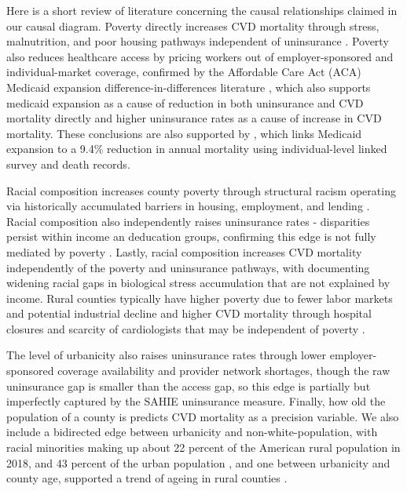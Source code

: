 \documentclass{article}
\theoremstyle{plain}
\theoremstyle{definition}
\theoremstyle{remark}
\begin{document}
\justifying
\noindent

Here is a short review of literature concerning
the causal relationships claimed in our causal diagram.
Poverty directly increases CVD mortality through stress,
malnutrition, and poor housing pathways independent of uninsurance \citep{kim2025mediating}. Poverty also reduces
healthcare access by pricing workers out of employer-sponsored and individual-market coverage, confirmed by the Affordable Care Act (ACA) Medicaid expansion difference-in-differences literature \citep{khatana2019association}, which also supports medicaid expansion as a cause of reduction in both uninsurance and CVD mortality directly and higher uninsurance rates as a cause of increase in CVD mortality. These conclusions are also supported by \citet{miller2021medicaid}, which links Medicaid expansion
to a 9.4\% reduction in annual mortality using individual-level linked survey and death records. 

Racial composition increases county poverty through structural racism operating via historically accumulated barriers in housing, employment, and lending \citep{bailey2021structural}. Racial composition also independently raises uninsurance rates - disparities persist within income an deducation groups, confirming this edge is not fully mediated by poverty \citep{lee2021convergence}. Lastly, racial composition increases CVD mortality independently of the poverty and uninsurance pathways, with \citet{geronimus2006weathering}
documenting widening racial gaps in biological stress accumulation that are not explained by income. Rural counties typically have higher poverty due to fewer labor markets and potential industrial decline \citep{farrigan2026rural} and higher CVD mortality through
hospital closures and scarcity of cardiologists that may be independent of poverty \citep{loccoh2022rural}.

The level of urbanicity also raises uninsurance rates through lower employer-sponsored coverage availability
and provider network shortages, though the raw uninsurance gap is smaller than the access gap, so this edge is partially but imperfectly captured by the SAHIE uninsurance measure. Finally, how old the population of a county is predicts CVD mortality as a precision variable. We also include a bidirected edge between urbanicity and non-white-population, with racial minorities making up about 22 percent of the American rural population in 2018, and 43 percent of the urban population \citep{castillo2020racial},
and one between urbanicity and county age, supported a trend of ageing in rural counties \citep{monnat2025us, cohen2023aging}.
\end{document}
